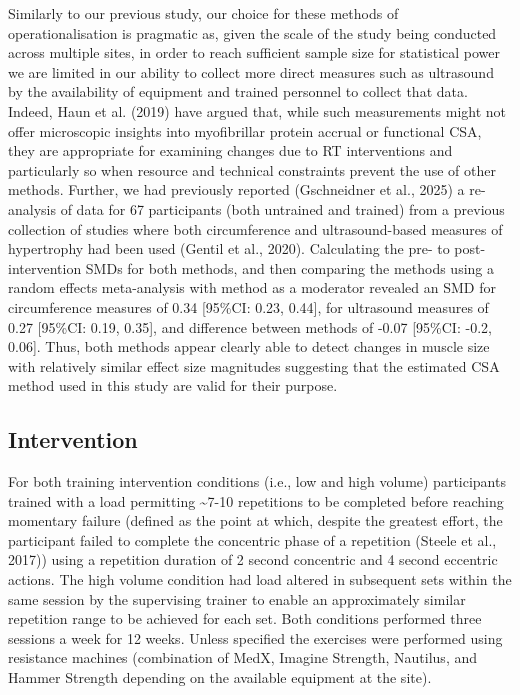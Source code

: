 \documentclass[
]{article}
\begin{document}
Similarly to our previous study, our choice for these methods of
operationalisation is pragmatic as, given the scale of the study being
conducted across multiple sites, in order to reach sufficient sample
size for statistical power we are limited in our ability to collect more
direct measures such as ultrasound by the availability of equipment and
trained personnel to collect that data. Indeed, Haun et al. (2019) have
argued that, while such measurements might not offer microscopic
insights into myofibrillar protein accrual or functional CSA, they are
appropriate for examining changes due to RT interventions and
particularly so when resource and technical constraints prevent the use
of other methods. Further, we had previously reported (Gschneidner et
al., 2025) a re-analysis of data for 67 participants (both untrained and
trained) from a previous collection of studies where both circumference
and ultrasound-based measures of hypertrophy had been used (Gentil et
al., 2020). Calculating the pre- to post-intervention SMDs for both
methods, and then comparing the methods using a random effects
meta-analysis with method as a moderator revealed an SMD for
circumference measures of 0.34 {[}95\%CI: 0.23, 0.44{]}, for ultrasound
measures of 0.27 {[}95\%CI: 0.19, 0.35{]}, and difference between
methods of -0.07 {[}95\%CI: -0.2, 0.06{]}. Thus, both methods appear
clearly able to detect changes in muscle size with relatively similar
effect size magnitudes suggesting that the estimated CSA method used in
this study are valid for their purpose.

\subsection{Intervention}\label{intervention}

For both training intervention conditions (i.e., low and high volume)
participants trained with a load permitting \textasciitilde7-10
repetitions to be completed before reaching momentary failure (defined
as the point at which, despite the greatest effort, the participant
failed to complete the concentric phase of a repetition (Steele et al.,
2017)) using a repetition duration of 2 second concentric and 4 second
eccentric actions. The high volume condition had load altered in
subsequent sets within the same session by the supervising trainer to
enable an approximately similar repetition range to be achieved for each
set. Both conditions performed three sessions a week for 12 weeks.
Unless specified the exercises were performed using resistance machines
(combination of MedX, Imagine Strength, Nautilus, and Hammer Strength
depending on the available equipment at the site).
\end{document}
